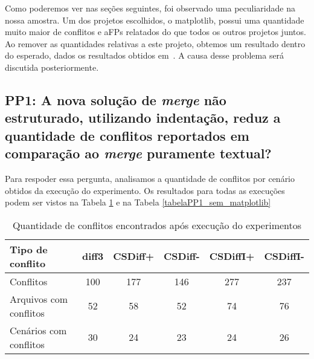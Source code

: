 Como poderemos ver nas seções seguintes, foi observado uma peculiaridade na nossa amostra. Um dos projetos escolhidos, o
matplotlib, possui uma quantidade muito maior de conflitos e aFPs relatados do que todos os outros projetos juntos. Ao remover
as quantidades relativas a este projeto, obtemos um resultado dentro do esperado, dados os resultados obtidos
em~\cite{clem21,heitor21}. A causa desse problema será discutida posteriormente.

\subsection{PP1: A nova solução de \emph{merge} não estruturado, utilizando indentação,
	reduz a quantidade de conflitos reportados em comparação ao \emph{merge} puramente textual?}
Para respoder essa pergunta, analisamos a quantidade de conflitos por cenário obtidos da execução do experimento. Os
resultados para todas as execuções podem ser vistos na Tabela \ref{tabelaPP1_com_matplotlib} e na
Tabela \ref{tabelaPP1_sem_matplotlib}

\begin{table}[ht]
	\begin{center}
		\begin{tabular}{|l|c|c|c|c|c|}
			\hline
			\textbf{Tipo de conflito} & \textbf{diff3} & \textbf{CSDiff+} & \textbf{CSDiff-} & \textbf{CSDiffI+} & \textbf{CSDiffI-} \\
			\hline
			Conflitos                 & 100            & 177              & 146              & 277               & 237               \\
			Arquivos com conflitos    & 52             & 58               & 52               & 74                & 76                \\
			Cenários com conflitos    & 30             & 24               & 23               & 24                & 26                \\
			\hline
		\end{tabular}
	\end{center}
	\caption{Quantidade de conflitos encontrados após execução do experimentos}\label{tabelaPP1_com_matplotlib}
\end{table}

